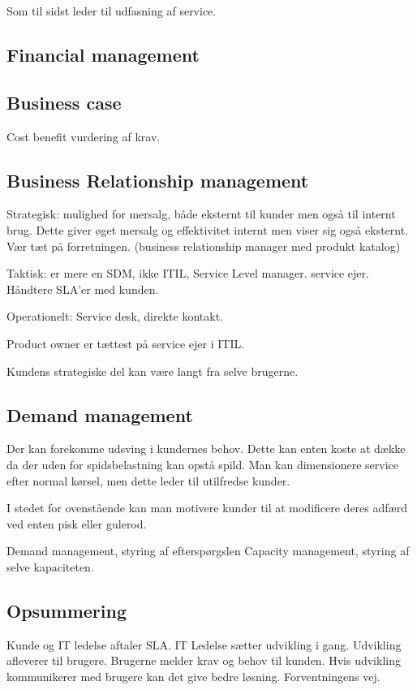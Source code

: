 Som til sidst leder til udfasning af service.

\subsection{Financial management}

\subsection{Business case}
Cost benefit vurdering af krav.


\subsection{Business Relationship management}
Strategisk: mulighed for mersalg, både eksternt til kunder men også til internt brug. Dette giver øget mersalg og effektivitet internt men viser sig også eksternt. Vær tæt på forretningen. (business relationship manager med produkt katalog)

Taktisk: er mere en SDM, ikke ITIL, Service Level manager. service ejer. Håndtere SLA'er med kunden.

Operationelt: Service desk, direkte kontakt.

Product owner er tættest på service ejer i ITIL.

Kundens strategiske del kan være langt fra selve brugerne.

\subsection{Demand management}
Der kan forekomme udsving i kundernes behov. Dette kan enten koste at dække da der uden for spidsbelastning kan opstå spild. Man kan dimensionere service efter normal kørsel, men dette leder til utilfredse kunder.

I stedet for ovenstående kan man motivere kunder til at modificere deres adfærd ved enten pisk eller gulerod.

Demand management, styring af efterspørgslen
Capacity management, styring af selve kapaciteten.


\subsection{Opsummering}

Kunde og IT ledelse aftaler SLA. IT Ledelse sætter udvikling i gang. Udvikling afleverer til brugere. Brugerne melder krav og behov til kunden. Hvis udvikling kommunikerer med brugere kan det give bedre løsning. Forventningens vej.

